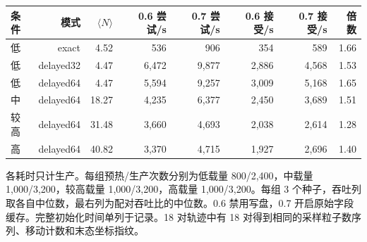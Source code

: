 \begin{center}\small\begin{tabular}{@{}lrrrrrrr@{}}\toprule
条件 & 模式 & $\langle N\rangle$ & 0.6 尝试/s & 0.7 尝试/s & 0.6 接受/s & 0.7 接受/s & 倍数\\\midrule
低 & exact & 4.52 & 536 & 906 & 354 & 589 & 1.66\\
低 & delayed32 & 4.47 & 6,472 & 9,877 & 2,886 & 4,568 & 1.53\\
低 & delayed64 & 4.47 & 5,594 & 9,257 & 3,009 & 5,168 & 1.65\\
中 & delayed64 & 18.27 & 4,235 & 6,377 & 2,450 & 3,689 & 1.51\\
较高 & delayed64 & 31.48 & 3,660 & 4,693 & 2,038 & 2,614 & 1.28\\
高 & delayed64 & 40.82 & 3,370 & 4,715 & 1,927 & 2,696 & 1.40\\
\bottomrule\end{tabular}\end{center}
各耗时只计生产。每组预热/生产次数分别为低载量 800/2,400，中载量 1,000/3,200，较高载量 1,000/3,200，高载量 1,000/3,200。每组 3 个种子，吞吐列取各自中位数，最右列为配对吞吐比的中位数。0.6 禁用写盘，0.7 开启原始字段缓存。完整初始化时间单列于记录。18 对轨迹中有 18 对得到相同的采样粒子数序列、移动计数和末态坐标指纹。
